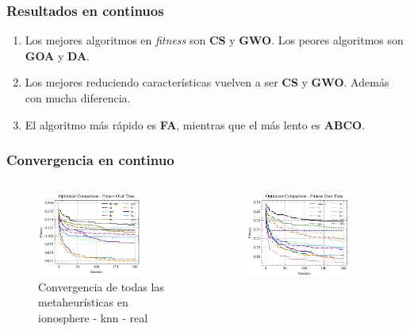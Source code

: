 \begin{frame}
    \frametitle{Resultados en continuos}
    \begin{enumerate}
        \item Los mejores algoritmos en \textit{fitness} son \textbf{CS} y \textbf{GWO}. Los peores algoritmos son \textbf{GOA} y \textbf{DA}.
        \item Los mejores reduciendo características vuelven a ser \textbf{CS} y \textbf{GWO}. Además con mucha diferencia.
        \item El algoritmo más rápido es \textbf{FA}, mientras que el más lento es \textbf{ABCO}.
    \end{enumerate}
\end{frame}


\begin{frame}
    \frametitle{Convergencia en continuo}
    \begin{columns}
        \begin{figure}[htp]
            \includegraphics[width=0.8\textwidth]{imagenes/chapter5/optimizers_fitness_knn_io.png}
            \caption{Convergencia de todas las metaheurísticas en ionosphere - knn - real}
        \end{figure}
        \begin{figure}[htp]
            \includegraphics[width=0.8\textwidth]{imagenes/chapter5/optimizers_fitness_knn_dia.png}

\end{figure}
\end{columns}
\end{frame}
